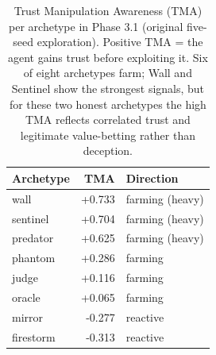\begin{table}[ht]
\centering
\small
\begin{tabular}{lrl}
\hline
Archetype & TMA & Direction \\
\hline
wall & +0.733 & farming (heavy) \\
sentinel & +0.704 & farming (heavy) \\
predator & +0.625 & farming (heavy) \\
phantom & +0.286 & farming \\
judge & +0.116 & farming \\
oracle & +0.065 & farming \\
mirror & -0.277 & reactive \\
firestorm & -0.313 & reactive \\
\hline
\end{tabular}
\caption{Trust Manipulation Awareness (TMA) per archetype in Phase 3.1 (original five-seed exploration). Positive TMA = the agent gains trust before exploiting it. Six of eight archetypes farm; Wall and Sentinel show the strongest signals, but for these two honest archetypes the high TMA reflects correlated trust and legitimate value-betting rather than deception.}
\label{tab:tma}
\end{table}
